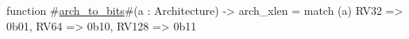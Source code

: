 function #\hyperref[sailRISCVzarchzytozybits]{arch\_to\_bits}#(a : Architecture) -> arch_xlen =
  match (a) {
    RV32  => 0b01,
    RV64  => 0b10,
    RV128 => 0b11
  }
